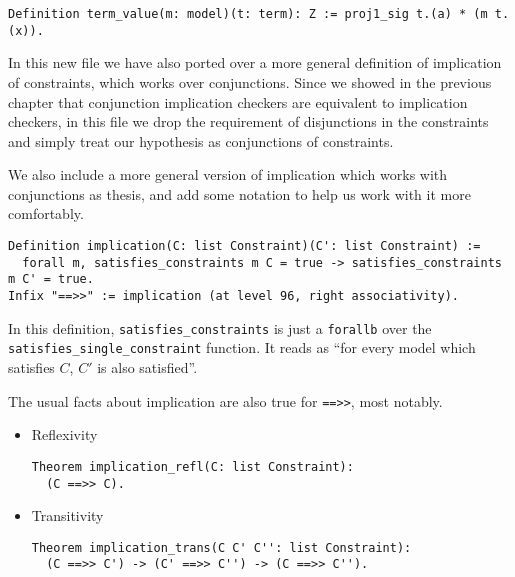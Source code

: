 \begin{verbatim}
Definition term_value(m: model)(t: term): Z := proj1_sig t.(a) * (m t.(x)).
\end{verbatim}



In this new file we have also ported over a more general definition of implication of
constraints, which works over conjunctions. Since we showed in the previous chapter
that conjunction implication checkers are equivalent to implication checkers, in this
file we drop the requirement of disjunctions in the constraints and simply treat our
hypothesis as conjunctions of constraints.

We also include a more general version of implication which works with conjunctions as
thesis, and add some notation to help us work with it more comfortably.

\begin{verbatim}
Definition implication(C: list Constraint)(C': list Constraint) :=
  forall m, satisfies_constraints m C = true -> satisfies_constraints m C' = true.
Infix "==>>" := implication (at level 96, right associativity).
\end{verbatim}

In this definition, \texttt{satisfies_constraints} is just a \texttt{forallb}
over the \texttt{satisfies_single_constraint} function. It reads as ``for every model
which satisfies $C$, $C'$ is also satisfied''.

The usual facts about implication are also true for \texttt{==>>}, most notably.

\begin{itemize}
    \item Reflexivity
\begin{verbatim}
Theorem implication_refl(C: list Constraint):
  (C ==>> C).
\end{verbatim}

    \item Transitivity
\begin{verbatim}
Theorem implication_trans(C C' C'': list Constraint):
  (C ==>> C') -> (C' ==>> C'') -> (C ==>> C'').
\end{verbatim}
  
\end{itemize}

